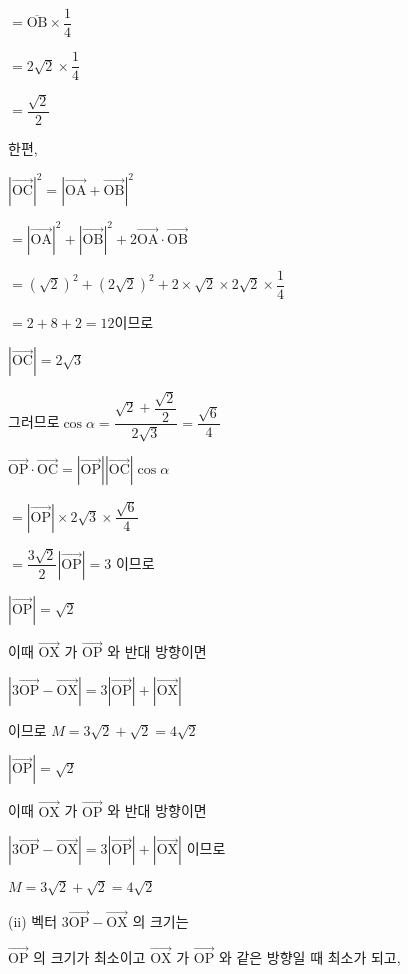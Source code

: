 \documentclass{oblivoir}
\begin{document}
$=\overline{\mathrm{OB}} \times \dfrac{1}{4}$

$=2 \sqrt{2} \times \dfrac{1}{4}$

$=\dfrac{\sqrt{2}}{2} $

한편,

$|\overrightarrow{\mathrm{OC}}|^{2}=|\overrightarrow{\mathrm{OA}}+\overrightarrow{\mathrm{OB}}|^{2}$

$=|\overrightarrow{\mathrm{OA}}|^{2}+|\overrightarrow{\mathrm{OB}}|^{2}+2 \overrightarrow{\mathrm{OA}} \cdot \overrightarrow{\mathrm{OB}}$

$=(\sqrt{2})^{2}+(2 \sqrt{2})^{2}+2 \times \sqrt{2} \times 2 \sqrt{2} \times \dfrac{1}{4}$

$=2+8+2=12$이므로

$|\overrightarrow{\mathrm{OC}}|=2 \sqrt{3}$

그러므로$\cos \alpha=\dfrac{\sqrt{2}+\dfrac{\sqrt{2}}{2}}{2 \sqrt{3}}=\dfrac{\sqrt{6}}{4}$

$\overrightarrow{\mathrm{OP}} \cdot \overrightarrow{\mathrm{OC}}=|\overrightarrow{\mathrm{OP}}||\overrightarrow{\mathrm{OC}}| \cos \alpha$

$ =|\overrightarrow{\mathrm{OP}}| \times 2 \sqrt{3} \times \dfrac{\sqrt{6}}{4} $

$=\dfrac{3 \sqrt{2}}{2}|\overrightarrow{\mathrm{OP}}|=3$ 이므로

$|\overrightarrow{\mathrm{OP}}|=\sqrt{2}$

이때 $\overrightarrow{\mathrm{OX}}$ 가 $\overrightarrow{\mathrm{OP}}$ 와 반대 방향이면

$|3 \overrightarrow{\mathrm{OP}}-\overrightarrow{\mathrm{OX}}|=3|\overrightarrow{\mathrm{OP}}|+|\overrightarrow{\mathrm{OX}}|$

이므로 $M=3 \sqrt{2}+\sqrt{2}=4 \sqrt{2}$

$|\overrightarrow{\mathrm{OP}}|=\sqrt{2}$

이때 $\overrightarrow{\mathrm{OX}}$ 가 $\overrightarrow{\mathrm{OP}}$ 와 반대 방향이면

$|3 \overrightarrow{\mathrm{OP}}-\overrightarrow{\mathrm{OX}}|=3|\overrightarrow{\mathrm{OP}}|+|\overrightarrow{\mathrm{OX}}|$
이므로

$M=3 \sqrt{2}+\sqrt{2}=4 \sqrt{2}$

(ii) 벡터 $3 \overrightarrow{\mathrm{OP}}-\overrightarrow{\mathrm{OX}}$ 의 크기는

$\overrightarrow{\mathrm{OP}}$ 의 크기가 최소이고 $\overrightarrow{\mathrm{OX}}$ 가 $\overrightarrow{\mathrm{OP}}$ 와 같은 방향일 때 최소가 되고,
\end{document}
